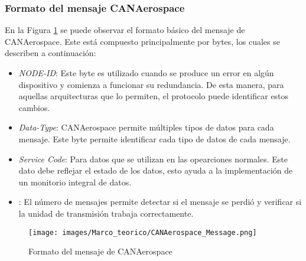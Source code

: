 \subsubsection{Formato del mensaje CANAerospace}
En la Figura \ref{fig:CANAerospaceMessage} se puede observar el formato
básico del mensaje de CANAerospace. Este está compuesto principalmente
por bytes, los cuales se describen a continuación:
\begin{itemize}
\item \textit{NODE-ID}: Este byte es utilizado cuando se produce un error en algún
  dispositivo y comienza a funcionar su redundancia. De esta manera, para aquellas
  arquitecturas que lo permiten, el protocolo puede identificar estos cambios.
\item \textit{Data-Type}: CANAerospace permite múltiples tipos de datos para cada mensaje.
  Este byte permite identificar cada tipo de datos de cada mensaje.
\item \textit{Service Code}: Para datos que se utilizan en las opearciones
  normales. Este dato debe reflejar el estado de los datos, esto ayuda a la
  implementación de un monitorio integral de datos.
\item {}: El número de mensajes permite detectar si el mensaje
  se perdió y verificar si la unidad de transmisión trabaja correctamente. 
\end{itemize}

\begin{figure}[h]
 \centering
 \texttt{[image: images/Marco\_teorico/CANAerospace\_Message.png]}
  \caption{Formato del mensaje de CANAerospace}
\label{fig:CANAerospaceMessage}
\end{figure}


